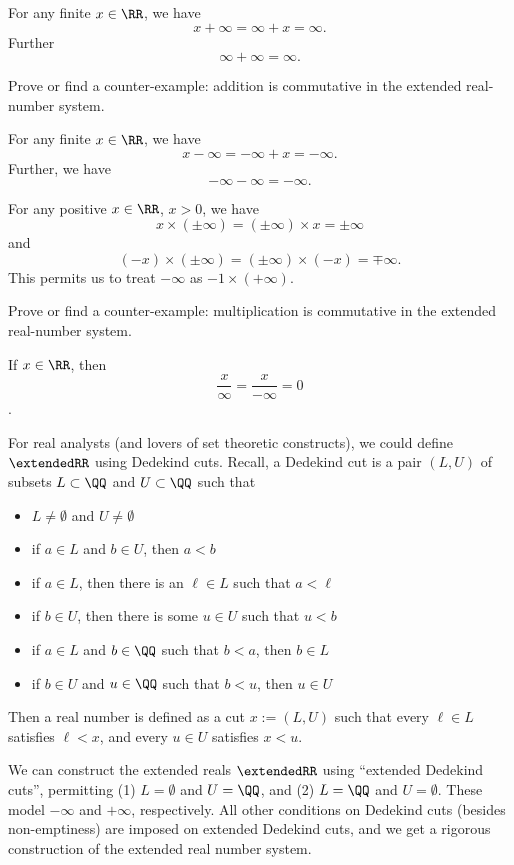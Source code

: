\begin{axiom}[Addition]
  For any finite $x\in\RR$, we have
  $$x+\infty=\infty+x=\infty.$$
  Further
  $$\infty+\infty=\infty.$$
\end{axiom}
\begin{xca}
  Prove or find a counter-example: addition is commutative in the
  extended real-number system.
\end{xca}
\begin{axiom}[Subtraction]
  For any finite $x\in\RR$, we have
  $$x-\infty=-\infty+x=-\infty.$$
  Further, we have
  $$-\infty-\infty=-\infty.$$
\end{axiom}
\begin{axiom}[Multiplication]
  For any positive $x\in\RR$, $x>0$, we have
  $$x\times(\pm\infty)=(\pm\infty)\times x = \pm\infty$$
  and
  $$(-x)\times(\pm\infty)=(\pm\infty)\times(-x)=\mp\infty.$$
  This permits us to treat $-\infty$ as $-1\times(+\infty)$.
\end{axiom}
\begin{xca}
  Prove or find a counter-example: multiplication is commutative in the
  extended real-number system.
\end{xca}
\begin{axiom}[Division]
  If $x\in\RR$, then
  $$\frac{x}{\infty}=\frac{x}{-\infty}=0$$.
\end{axiom}

\begin{rmk}
For real analysts (and lovers of set theoretic constructs), we could
define $\extendedRR$ using Dedekind cuts. Recall, a Dedekind cut is a
pair $(L,U)$ of subsets $L\subset\QQ$ and $U\subset\QQ$ such that
\begin{itemize}
\item $L\neq\emptyset$ and $U\neq\emptyset$
\item if $a\in L$ and $b\in U$, then $a<b$
\item if $a\in L$, then there is an $\ell\in L$ such that $a < \ell$
\item if $b\in U$, then there is some $u\in U$ such that $u < b$
\item if $a\in L$ and $b\in\QQ$ such that $b < a$, then $b\in L$
\item if $b\in U$ and $u\in\QQ$ such that $b < u$, then $u\in U$
\end{itemize}
Then a real number is defined as a cut $x := (L,U)$ such that every
$\ell\in L$ satisfies $\ell < x$, and every $u\in U$ satisfies $x < u$.

We can construct the extended reals $\extendedRR$ using ``extended
Dedekind cuts'', permitting (1) $L=\emptyset$ and $U=\QQ$, and (2)
$L=\QQ$ and $U=\emptyset$. These model $-\infty$ and $+\infty$,
respectively. All other conditions on Dedekind cuts (besides
non-emptiness) are imposed on extended Dedekind cuts, and we get a
rigorous construction of the extended real number system.
\end{rmk}

